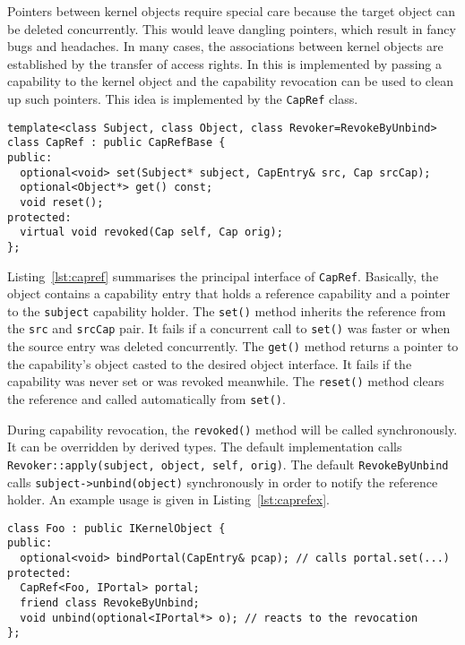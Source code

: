 Pointers between kernel objects require special care because the
target object can be deleted concurrently.  This would leave dangling
pointers, which result in fancy bugs and headaches.  In many cases,
the associations between kernel objects are established by the
transfer of access rights.  In \mythos this is implemented by passing
a capability to the kernel object and the capability revocation can be
used to clean up such pointers.  This idea is implemented by the
\texttt{CapRef} class.

\begin{lstlisting}[float, label=lst:capref, caption=The weak reference capability interface.]
template<class Subject, class Object, class Revoker=RevokeByUnbind>
class CapRef : public CapRefBase {
public:
  optional<void> set(Subject* subject, CapEntry& src, Cap srcCap);
  optional<Object*> get() const;
  void reset();
protected:
  virtual void revoked(Cap self, Cap orig);
};
\end{lstlisting}

Listing~\ref{lst:capref} summarises the principal interface of
\texttt{CapRef}. Basically, the object contains a capability entry
that holds a reference capability and a pointer to the
\texttt{subject} capability holder.  The \texttt{set()} method
inherits the reference from the \texttt{src} and \texttt{srcCap} pair.
It fails if a concurrent call to \texttt{set()} was faster or when the
source entry was deleted concurrently.  The \texttt{get()} method
returns a pointer to the capability's object casted to the desired
object interface.  It fails if the capability was never set or was
revoked meanwhile.  The \texttt{reset()} method clears the reference
and called automatically from \texttt{set()}.

During capability revocation, the \texttt{revoked()} method will be
called synchronously.  It can be overridden by derived types.  The
default implementation calls
\lstinline{Revoker::apply(subject, object, self, orig)}.
The default \texttt{RevokeByUnbind} calls
\lstinline{subject->unbind(object)} synchronously in order to notify the reference
holder. An example usage is given in Listing~\ref{lst:caprefex}.

\begin{lstlisting}[float, label=lst:caprefex, caption=An example use of weak references.]
class Foo : public IKernelObject {
public:
  optional<void> bindPortal(CapEntry& pcap); // calls portal.set(...)
protected:
  CapRef<Foo, IPortal> portal;
  friend class RevokeByUnbind;
  void unbind(optional<IPortal*> o); // reacts to the revocation
};
\end{lstlisting}

